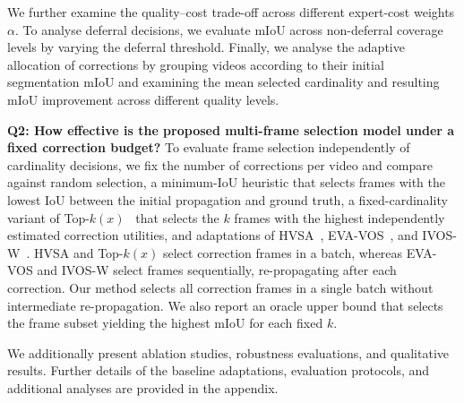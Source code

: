 We further examine the quality--cost trade-off across different
expert-cost weights $\alpha$. To analyse deferral decisions,
we evaluate mIoU across non-deferral coverage levels by varying
the deferral threshold. Finally, we analyse the adaptive allocation of corrections
by grouping videos according to their initial segmentation
mIoU and examining the mean selected cardinality and
resulting mIoU improvement across different quality levels.

\noindent\textbf{Q2: How effective is the proposed multi-frame
selection model under a fixed correction budget?}
To evaluate frame selection independently of cardinality decisions,
we fix the number of corrections per video and compare against
random selection, a minimum-IoU heuristic that selects frames
with the lowest IoU between the initial propagation and ground truth,
a fixed-cardinality variant of Top-$k(x)$~\cite{montreuil2025ask}
that selects the $k$ frames with the highest independently estimated
correction utilities, and adaptations of HVSA~\cite{hvsa},
EVA-VOS~\cite{delatolas2024learning}, and IVOS-W~\cite{IVOSW}.
HVSA and Top-$k(x)$ select correction frames in a batch, whereas
EVA-VOS and IVOS-W select frames sequentially, re-propagating
after each correction. Our method selects all correction frames
in a single batch without intermediate re-propagation.
We also report an oracle upper bound that selects the frame
subset yielding the highest mIoU for each fixed $k$.

We additionally present ablation studies, robustness evaluations,
and qualitative results. Further details of the baseline adaptations,
evaluation protocols, and additional analyses are provided in the appendix.



